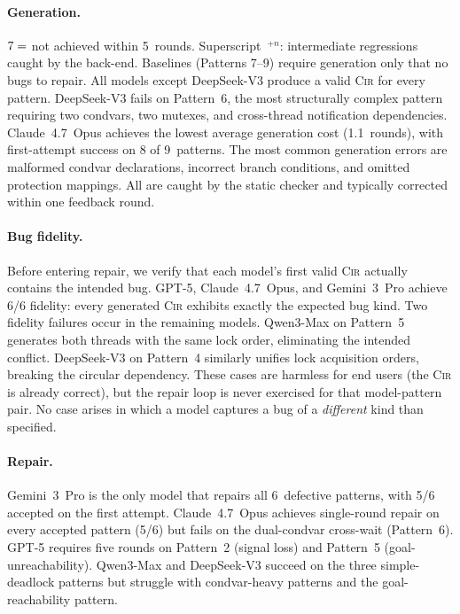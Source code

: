 \documentclass{article}
\begin{document}
\paragraph{Generation.}
$\ding{55}=$ not achieved within 5~rounds. Superscript~${}^{+n}$: intermediate regressions caught by the back-end. Baselines (Patterns 7--9) require generation only that no bugs to repair. All models except DeepSeek-V3 produce a valid \textsc{Cir} for every pattern.  DeepSeek-V3 fails on Pattern~6, the most structurally complex pattern requiring two condvars, two mutexes, and cross-thread notification dependencies. Claude~4.7~Opus achieves the lowest average generation cost (1.1~rounds), with first-attempt success on 8 of 9~patterns. The most common generation errors are malformed condvar declarations, incorrect branch conditions, and omitted protection mappings. All are caught by the static checker and typically corrected within one feedback round.

\paragraph{Bug fidelity.}
Before entering repair, we verify that each model's first valid \textsc{Cir} actually contains the intended bug. GPT-5, Claude~4.7~Opus, and Gemini~3~Pro achieve 6/6 fidelity: every generated \textsc{Cir} exhibits exactly the expected bug kind. Two fidelity failures occur in the remaining models. Qwen3-Max on Pattern~5 generates both threads with the same lock order, eliminating the intended conflict. DeepSeek-V3 on Pattern~4 similarly unifies lock acquisition orders, breaking the circular dependency. These cases are harmless for end users (the \textsc{Cir} is already correct), but the repair loop is never exercised for that model-pattern pair. No case arises in which a model captures a bug of a \emph{different} kind than specified.

\paragraph{Repair.}
Gemini~3~Pro is the only model that repairs all 6~defective patterns, with 5/6 accepted on the first attempt. Claude~4.7~Opus achieves single-round repair on every accepted pattern (5/6) but fails on the dual-condvar cross-wait (Pattern~6). GPT-5 requires five rounds on Pattern~2 (signal loss) and Pattern~5 (goal-unreachability). Qwen3-Max and DeepSeek-V3 succeed on the three simple-deadlock patterns but struggle with condvar-heavy patterns and the goal-reachability pattern.
\end{document}
